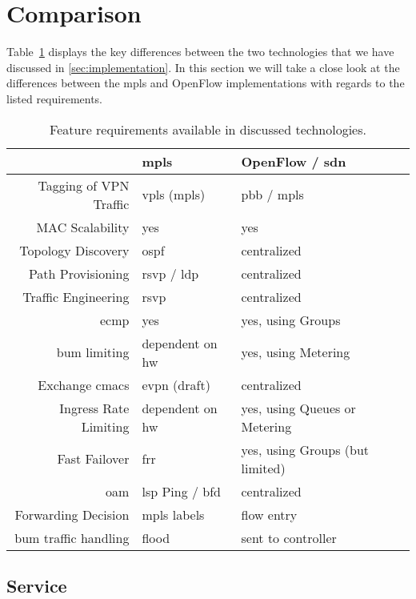 \section{Comparison} %
\label{sec:results}

Table~\ref{tb:reqs} displays the key differences between the two technologies that we have discussed in \ref{sec:implementation}. In this section we will take a close look at the differences between the \ac{mpls} and OpenFlow implementations with regards to the listed requirements.

\begin{table}[h]
	\centering
	\begin{tabular}{r|lll}
	 & \acs{mpls} & OpenFlow / \acs{sdn}\\
	\hline
	Tagging of VPN Traffic & \acs{vpls} (\acs{mpls}) & \acs{pbb} / \acs{mpls}\\
	MAC Scalability & yes & yes\\
	Topology Discovery & \acs{ospf} & centralized\\
	Path Provisioning & \acs{rsvp} / \acs{ldp} & centralized\\
	Traffic Engineering & \acs{rsvp} & centralized\\
	\ac{ecmp} & yes & yes, using Groups\\
	\ac{bum} limiting & dependent on \acs{hw} & yes, using Metering\\
	Exchange \acsp{cmac} & \ac{evpn} (draft) & centralized\\
	Ingress Rate Limiting & dependent on \acs{hw} & yes, using Queues or Metering\\
	Fast Failover & \acs{frr} & yes, using Groups (but limited)\\
	\acs{oam} & \acs{lsp} Ping / \acs{bfd} & centralized\\
	\hline
	Forwarding Decision & \acs{mpls} labels & flow entry \\
	\ac{bum} traffic handling & flood & sent to controller\\
	\end{tabular}
	\caption{Feature requirements available in discussed technologies.}
	\label{tb:reqs}
\end{table}

\subsection{Service} %
\label{sub:service}

